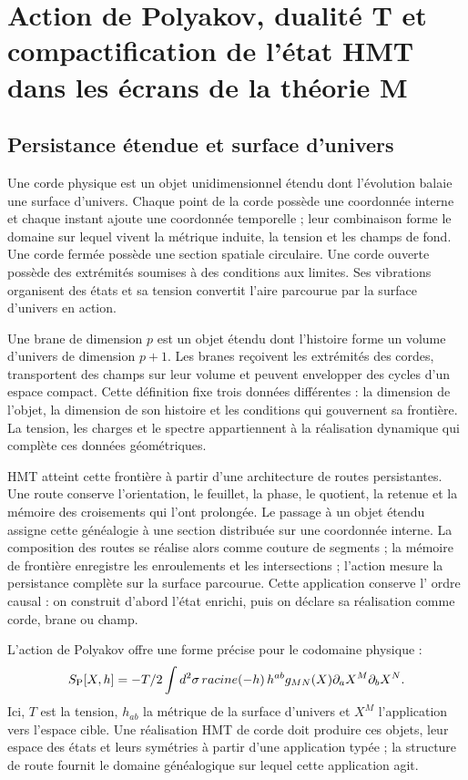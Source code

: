 \chapter{Action de Polyakov, dualité T et compactification de l'état HMT dans les écrans de la théorie M}
\label{chap:teoria-m}

\section{Persistance étendue et surface d’univers}

Une corde physique est un objet unidimensionnel étendu dont l'évolution balaie
une surface d'univers. Chaque point de la corde possède une coordonnée interne
et chaque instant ajoute une coordonnée temporelle ; leur combinaison forme
le domaine sur lequel vivent la métrique induite, la tension et les champs de
fond. Une corde fermée possède une section spatiale circulaire. Une corde ouverte
possède des extrémités soumises à des conditions aux limites. Ses vibrations organisent
des états et sa tension convertit l'aire parcourue par la surface d'univers en
action.

Une brane de dimension \(p\) est un objet étendu dont l'histoire forme un
volume d'univers de dimension \(p+1\). Les branes reçoivent les extrémités des cordes,
transportent des champs sur leur volume et peuvent envelopper des cycles d'un espace
compact. Cette définition fixe trois données différentes : la dimension de l'objet,
la dimension de son histoire et les conditions qui gouvernent sa frontière. La
tension, les charges et le spectre appartiennent à la réalisation dynamique qui
complète ces données géométriques.

HMT atteint cette frontière à partir d'une architecture de routes persistantes. Une
route conserve l'orientation, le feuillet, la phase, le quotient, la retenue et la mémoire des
croisements qui l'ont prolongée. Le passage à un objet étendu assigne cette
généalogie à une section distribuée sur une coordonnée interne. La
composition des routes se réalise alors comme couture de segments ; la mémoire
de frontière enregistre les enroulements et les intersections ; l'action mesure la
persistance complète sur la surface parcourue. Cette application conserve l'
ordre causal : on construit d'abord l'état enrichi, puis on déclare
sa réalisation comme corde, brane ou champ.

L'action de Polyakov offre une forme précise pour le codomaine physique :
\[
 S_{\rm P}[X,h]
 =-\frac{T}{2}\int d^2\sigma\,
 \sqrt{-h}\,h^{ab}g_{MN}(X)
 \partial_aX^M\partial_bX^N.
\]
Ici, \(T\) est la tension, \(h_{ab}\) la métrique de la surface d'univers et
\(X^M\) l'application vers l'espace cible. Une réalisation HMT de corde doit
produire ces objets, leur espace des états et leurs symétries à partir d'une application
typée ; la structure de route fournit le domaine généalogique sur lequel
cette application agit.


